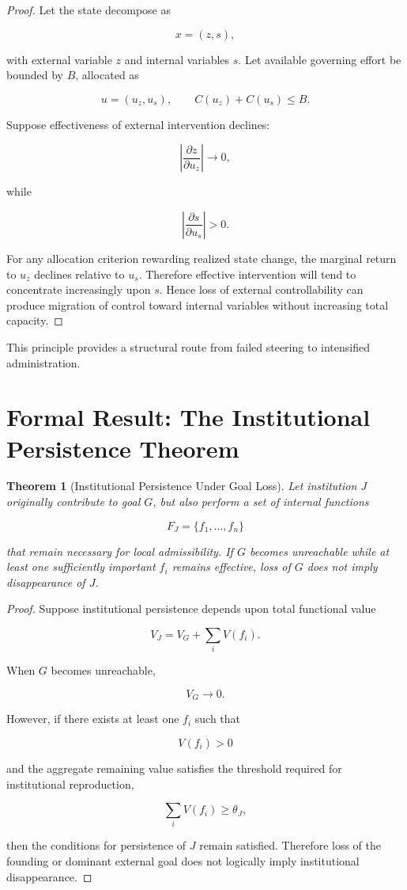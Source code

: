 \documentclass[11pt,oneside]{book}
\newtheorem{theorem}{Theorem}[chapter]
\theoremstyle{definition}
\theoremstyle{remark}
\begin{document}
\begin{proof}
Let the state decompose as

\[
x=(z,s),
\]

with external variable \(z\) and internal variables \(s\). Let available governing effort be bounded by \(B\), allocated as

\[
u=(u_z,u_s),
\qquad
C(u_z)+C(u_s)\leq B.
\]

Suppose effectiveness of external intervention declines:

\[
\left|
\frac{\partial z}{\partial u_z}
\right|
\rightarrow0,
\]

while

\[
\left|
\frac{\partial s}{\partial u_s}
\right|>0.
\]

For any allocation criterion rewarding realized state change, the marginal return to \(u_z\) declines relative to \(u_s\). Therefore effective intervention will tend to concentrate increasingly upon \(s\). Hence loss of external controllability can produce migration of control toward internal variables without increasing total capacity.
\end{proof}

This principle provides a structural route from failed steering to intensified administration.

\section{Formal Result: The Institutional Persistence Theorem}

\begin{theorem}[Institutional Persistence Under Goal Loss]
Let institution \(J\) originally contribute to goal \(G\), but also perform a set of internal functions

\[
F_J=\{f_1,\ldots,f_n\}
\]

that remain necessary for local admissibility. If \(G\) becomes unreachable while at least one sufficiently important \(f_i\) remains effective, loss of \(G\) does not imply disappearance of \(J\).
\end{theorem}

\begin{proof}
Suppose institutional persistence depends upon total functional value

\[
V_J
=
V_G
+
\sum_iV(f_i).
\]

When \(G\) becomes unreachable,

\[
V_G\rightarrow0.
\]

However, if there exists at least one \(f_i\) such that

\[
V(f_i)>0
\]

and the aggregate remaining value satisfies the threshold required for institutional reproduction,

\[
\sum_iV(f_i)\geq\theta_J,
\]

then the conditions for persistence of \(J\) remain satisfied. Therefore loss of the founding or dominant external goal does not logically imply institutional disappearance.
\end{proof}
\end{document}
